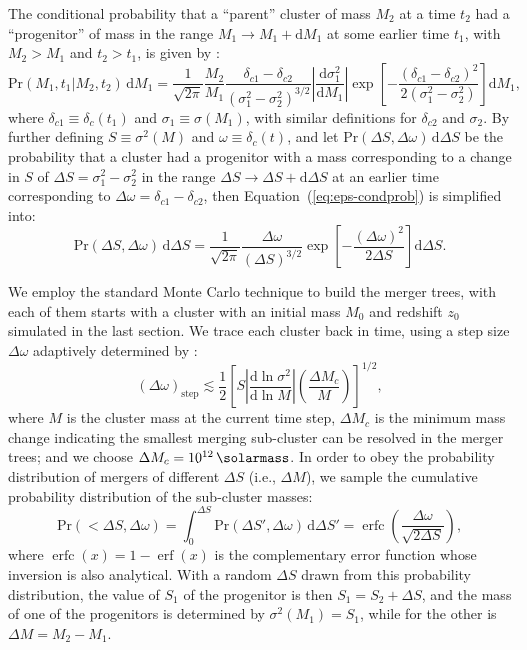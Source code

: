 \documentclass[modern]{aastex61}
\newcommand{\R}[1]{\mathrm{#1}}
\newcommand{\D}[1]{\R{d} #1}
\newcommand{\diff}[2]{\frac{\D{#1}}{\D{#2}}}
\DeclareMathOperator{\erf}{erf}
\DeclareMathOperator{\erfc}{erfc}
\begin{document}
The conditional probability that a \enquote{parent} cluster of mass $M_2$
at a time $t_2$ had a \enquote{progenitor} of mass in the range
$M_1 \to M_1 + \D{M_1}$ at some earlier time $t_1$,
with $M_2 > M_1$ and $t_2 > t_1$, is given by
\citep{lacey1993,randall2002}:
\begin{equation}
  \label{eq:eps-condprob}
  \R{Pr}(M_1, t_1 | M_2, t_2) \,\D{M_1} = \frac{1}{\sqrt{2\pi}} \frac{M_2}{M_1}
  \frac{\delta_{c1} - \delta_{c2}}{(\sigma_1^2 - \sigma_2^2)^{3/2}}
  \left| \diff{\sigma_1^2}{M_1} \right|
  \exp \!\left[ -\frac{(\delta_{c1} - \delta_{c2})^2}
    {2(\sigma_1^2 - \sigma_2^2)} \right] \D{M_1},
\end{equation}
where
$\delta_{c1} \equiv \delta_c(t_1)$ and $\sigma_1 \equiv \sigma(M_1)$,
with similar definitions for $\delta_{c2}$ and $\sigma_2$.
By further defining $S \equiv \sigma^2(M)$ and $\omega \equiv \delta_c(t)$,
and let $\R{Pr}(\Delta S, \Delta \omega) \,\D{\Delta S}$ be the probability
that a cluster had a progenitor with a mass corresponding to a change
in $S$ of $\Delta S = \sigma_1^2 - \sigma_2^2$ in the range
$\Delta S \to \Delta S + \D{\Delta S}$ at an earlier time
corresponding to $\Delta \omega = \delta_{c1} - \delta_{c2}$,
then Equation~(\ref{eq:eps-condprob}) is simplified into:
\begin{equation}
  \label{eq:eps-condprob-simp}
  \R{Pr}(\Delta S, \Delta \omega) \,\D{\Delta S} = \frac{1}{\sqrt{2\pi}}
  \frac{\Delta\omega}{(\Delta S)^{3/2}}
  \exp \!\left[ -\frac{(\Delta\omega)^2}{2 \Delta S} \right] \D{\Delta S}.
\end{equation}

We employ the standard Monte Carlo technique to build the merger trees,
with each of them starts with a cluster with an initial mass $M_0$
and redshift $z_0$ simulated in the last section.
We trace each cluster back in time, using a step size $\Delta\omega$
adaptively determined by \citep{randall2002}:
\begin{equation}
  \label{sec:dw-step}
  (\Delta\omega)_{\R{step}} \lesssim \frac{1}{2} \left[
    S \left| \diff{\ln \sigma^2}{\ln M} \right|
    \left( \frac{\Delta M_c}{M} \right) \right]^{1/2},
\end{equation}
where $M$ is the cluster mass at the current time step,
$\Delta M_c$ is the minimum mass change indicating the smallest
merging sub-cluster can be resolved in the merger trees;
and we choose $\Delta M_c = \SI{e12}{\solarmass}$.
In order to obey the probability distribution of mergers of different
$\Delta S$ (i.e., $\Delta M$), we sample the cumulative probability
distribution of the sub-cluster masses:
\begin{equation}
  \label{sec:cdf-sub-masses}
  \R{Pr}(<\!\Delta S, \Delta\omega) =
  \int_0^{\Delta S} \R{Pr}(\Delta S', \Delta\omega) \,\D{\Delta S'} =
  \erfc \!\left( \frac{\Delta \omega}{\sqrt{2 \Delta S}} \right),
\end{equation}
where $\erfc(x) = 1 - \erf(x)$ is the complementary error
function whose inversion is also analytical.
With a random $\Delta S$ drawn from this probability distribution,
the value of $S_1$ of the progenitor is then $S_1 = S_2 + \Delta S$,
and the mass of one of the progenitors is determined by
$\sigma^2(M_1) = S_1$, while for the other is $\Delta M = M_2 - M_1$.
\end{document}
